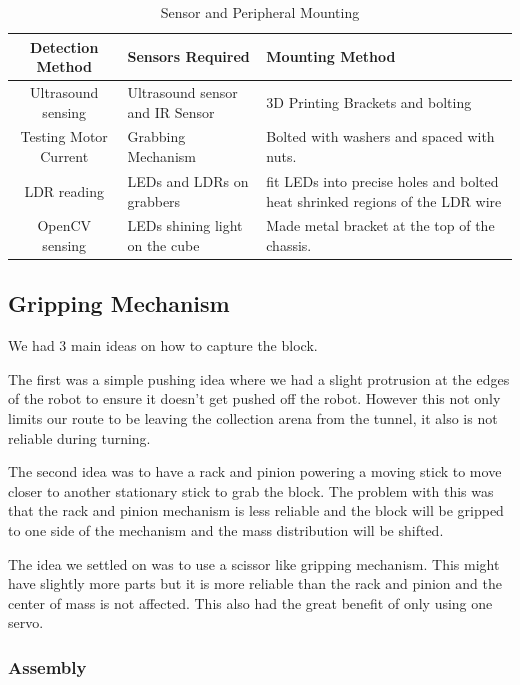 \documentclass{article}
\begin{document}
\begin{table}[]
    \centering
    \begin{tabular}{|c|p{5cm}|p{5cm}|}
        \hline
        Detection Method & Sensors Required & Mounting Method \\
        \hline
        Ultrasound sensing & Ultrasound sensor and IR Sensor & 3D Printing Brackets and bolting \\
        \hline
        Testing Motor Current & Grabbing Mechanism & Bolted with washers and spaced with nuts.\\
        \hline
        LDR reading & LEDs and LDRs on grabbers & fit LEDs into precise holes and bolted heat shrinked regions of the LDR wire \\
        \hline
        OpenCV sensing & LEDs shining light on the cube & Made metal bracket at the top of the chassis.\\
        \hline
    \end{tabular}
    \caption{Sensor and Peripheral Mounting}
    \label{tab:mount_sens}
\end{table}

\subsection{Gripping Mechanism}
\quad We had 3 main ideas on how to capture the block. 

\quad The first was a simple pushing idea where we had a slight protrusion at the edges of the robot to ensure it doesn't get pushed off the robot. However this not only limits our route to be leaving the collection arena from the tunnel, it also is not reliable during turning.

\quad The second idea was to have a rack and pinion powering a moving stick to move closer to another stationary stick to grab the block. The problem with this was that the rack and pinion mechanism is less reliable and the block will be gripped to one side of the mechanism and the mass distribution will be shifted.

\quad The idea we settled on was to use a scissor like gripping mechanism. This might have slightly more parts but it is more reliable than the rack and pinion and the center of mass is not affected. This also had the great benefit of only using one servo.

\subsubsection{Assembly}
\end{document}
